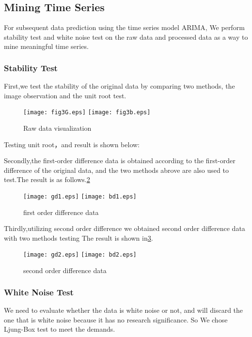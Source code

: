 \documentclass{mcmthesis}
\begin{document}
\subsection{Mining Time Series}
For subsequent data prediction using the time series model ARIMA,
We perform stability test and white noise test on the raw data and processed data as a way to mine meaningful time series.


\subsubsection{Stability Test}
First,we test the stability of the original data by comparing two methods, the image observation and the unit root test.

\begin{figure}[!hb]
  \centering 
  \texttt{[image: fig3G.eps]}
  \texttt{[image: fig3b.eps]}
  \caption{Raw data visualization} \label{fig3}
\end{figure}


Testing unit root，and result is shown below:

Secondly,the first-order difference data is obtained according to the first-order difference of the original data, 
and the two methods abrove are also used to test.The result is as follows.\ref{fig4}
\begin{figure}[!hb]
  \centering 
  \texttt{[image: gd1.eps]}
  \texttt{[image: bd1.eps]}
  \caption{first order difference data} \label{fig4}
\end{figure}



Thirdly,utilizing second order difference we obtained second order difference data with two methods testing
The result is shown in\ref{fig5}.
\begin{figure}[!h]
  \centering 
  \texttt{[image: gd2.eps]}
  \texttt{[image: bd2.eps]}
  \caption{second order difference data} \label{fig5}
\end{figure}


\subsubsection{White Noise Test}
We need to evaluate whether the data is white noise or not, 
and will discard the one that is white noise because it has no research significance.
So We chose Ljung-Box test to meet the demands.
\end{document}
